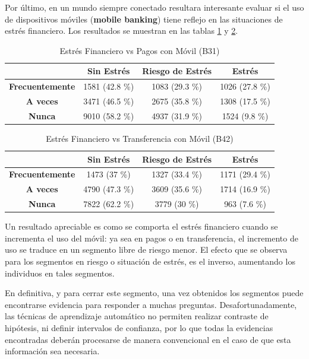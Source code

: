 \documentclass[a4paper, 11pt]{article}
\begin{document}
Por último, en un mundo siempre conectado resultara interesante evaluar si el 
uso de dispositivos móviles (\textbf{mobile banking}) tiene reflejo en las
situaciones de estrés financiero. Los resultados se muestran en las tablas 
\ref{tab:stress_vs_mobile_payment} y \ref{tab:stress_vs_mobile_transfer}.

\begin{table}[ht]
\centering
\begin{tabular}{cccc}
\toprule
 & \textbf{Sin Estrés} & \textbf{Riesgo de Estrés} & \textbf{Estrés}\\
\midrule
\textbf{Frecuentemente} & 1581 (42.8 \%) &	1083 (29.3 \%) &	1026 (27.8 \%)\\
\textbf{A veces} & 3471 (46.5 \%) &	2675 (35.8 \%) &	1308 (17.5 \%)\\
\textbf{Nunca} & 9010 (58.2 \%) &	4937 (31.9 \%) &	1524 (9.8 \%)\\
\bottomrule
\end{tabular}
\caption{Estrés Financiero vs Pagos con Móvil (B31)}
\label{tab:stress_vs_mobile_payment}
\end{table}

\begin{table}[ht]
\centering
\begin{tabular}{cccc}
\toprule
 & \textbf{Sin Estrés} & \textbf{Riesgo de Estrés} & \textbf{Estrés}\\
\midrule
\textbf{Frecuentemente} & 1473 (37 \%) &	1327 (33.4 \%) &	1171 (29.4 \%)\\
\textbf{A veces} & 4790 (47.3 \%) &	3609 (35.6 \%) &	1714 (16.9 \%)\\
\textbf{Nunca} & 7822 (62.2 \%) &	3779 (30 \%) &	963 (7.6 \%)\\
\bottomrule
\end{tabular}
\caption{Estrés Financiero vs Transferencia con Móvil (B42)}
\label{tab:stress_vs_mobile_transfer}
\end{table}

Un resultado apreciable es como se comporta el estrés financiero cuando se
incrementa el uso del móvil: ya sea en pagos o en transferencia, el
incremento de uso se traduce en un segmento libre de riesgo menor. El efecto
que se observa para los segmentos en riesgo o situación de estrés, es el
inverso, aumentando los individuos en tales segmentos.

En definitiva, y para cerrar este segmento, una vez obtenidos los segmentos 
puede encontrarse evidencia para responder a muchas preguntas. Desafortunadamente,
las técnicas de aprendizaje automático no permiten realizar contraste de 
hipótesis, ni definir intervalos de confianza, por lo que todas la evidencias 
encontradas deberán procesarse de manera convencional en el caso de que esta
información sea necesaria.
\end{document}
